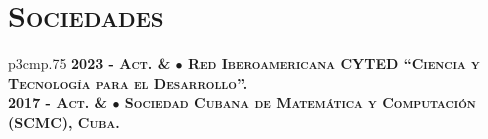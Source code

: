 
\section{\textsc{Sociedades}}

\begin{tabular}{p{3cm}p{.75\linewidth}}
\hfill\bfseries\scshape 2023 - Act. & $\bullet$ Red Iberoamericana CYTED ``Ciencia y Tecnolog\'ia para el Desarrollo''.\\
\hfill\bfseries\scshape 2017 - Act. & $\bullet$ Sociedad Cubana de Matem\'atica y Computaci\'on (SCMC), Cuba.
\end{tabular}